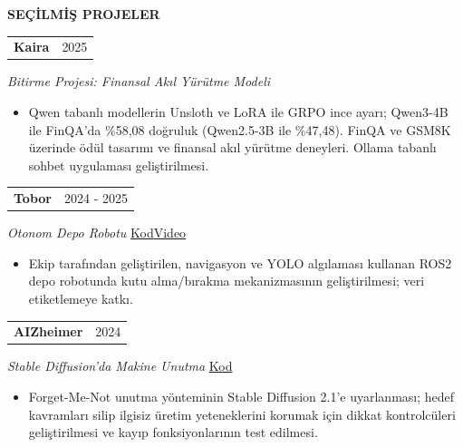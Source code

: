 \documentclass[11pt,a4paper]{article}
\makeatletter
\newcommand{\cvlink}[2]{\href{#1}{\textcolor{linkblue}{#2}}}
\newcommand{\cvsep}{\enspace\textperiodcentered\enspace{}}
\newcommand{\cvsection}[3][5]{%
  \par\Needspace*{#1\baselineskip}\vspace{6pt}%
  {\bfseries\fontsize{11}{13}\selectfont #3}\par\nobreak
  \vspace{3pt}{\color{muted}\hrule height 0.4pt}\nobreak\vspace{6pt}%
}
\newcommand{\cvheading}[2]{%
  \begin{tabularx}{\linewidth}{@{}>{\raggedright\arraybackslash}X@{\hspace{10pt}}r@{}}%
  \textbf{#1} & {\small\color{muted}#2}\\
  \end{tabularx}\par\nobreak
}
\newenvironment{cvpoints}{\begin{itemize}[leftmargin=12pt,itemsep=2pt,topsep=2pt,parsep=0pt]\small}{\end{itemize}}
\makeatother
\begin{document}
\cvsection{}{SEÇİLMİŞ PROJELER}
\begin{minipage}{\linewidth}\raggedright
\cvheading{Kaira}{2025}
{\small{}\itshape{}\color{muted}Bitirme Projesi: Finansal Akıl Yürütme Modeli}\hfill{\small{}%
%
}\par\vspace{2pt}
\begin{cvpoints}
\item Qwen tabanlı modellerin Unsloth ve LoRA ile GRPO ince ayarı; Qwen3-4B ile FinQA’da \%58,08 doğruluk (Qwen2.5-3B ile \%47,48). FinQA ve GSM8K üzerinde ödül tasarımı ve finansal akıl yürütme deneyleri. Ollama tabanlı sohbet uygulaması geliştirilmesi.
\end{cvpoints}
\end{minipage}\par\vspace{5pt}
\begin{minipage}{\linewidth}\raggedright
\cvheading{Tobor}{2024 - 2025}
{\small{}\itshape{}\color{muted}Otonom Depo Robotu}\hfill{\small{}%
\mbox{\cvlink{https://github.com/rusen-archive/Amazon-Warehouse-Robot}{Kod}}\cvsep\mbox{\cvlink{https://youtu.be/h-Jxs_y9kNA}{Video}}%
}\par\vspace{2pt}
\begin{cvpoints}
\item Ekip tarafından geliştirilen, navigasyon ve YOLO algılaması kullanan ROS2 depo robotunda kutu alma/bırakma mekanizmasının geliştirilmesi; veri etiketlemeye katkı.
\end{cvpoints}
\end{minipage}\par\vspace{5pt}
\begin{minipage}{\linewidth}\raggedright
\cvheading{AIZheimer}{2024}
{\small{}\itshape{}\color{muted}Stable Diffusion’da Makine Unutma}\hfill{\small{}%
\mbox{\cvlink{https://github.com/rusenbb/ai-zheimer}{Kod}}%
}\par\vspace{2pt}
\begin{cvpoints}
\item Forget-Me-Not unutma yönteminin Stable Diffusion 2.1’e uyarlanması; hedef kavramları silip ilgisiz üretim yeteneklerini korumak için dikkat kontrolcüleri geliştirilmesi ve kayıp fonksiyonlarının test edilmesi.
\end{cvpoints}
\end{minipage}\par\vspace{5pt}
\end{document}

